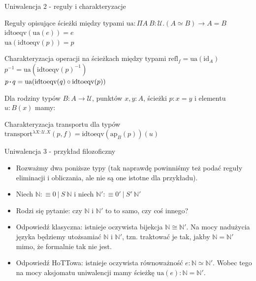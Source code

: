 \documentclass{beamer}
\newcommand{\defn}{:\equiv}
\newcommand{\U}{\mathcal{U}}
\newcommand{\id}{\text{id}}
\newcommand{\comp}{\circ}
\newcommand{\refl}[1]{\text{refl}_{#1}}
\newcommand{\inv}[1]{#1^{-1}}
\newcommand{\sq}{\mathbin{\vcenter{\hbox{\rule{.3ex}{.3ex}}}}}
\newcommand{\ap}[2]{\text{ap}_{#1}(#2)}
\newcommand{\transport}{\text{transport}}
\newcommand{\idtoeqv}{\text{idtoeqv}}
\newcommand{\ua}{\text{ua}}
\begin{document}
\begin{frame}{Uniwalencja 2 - reguły i charakteryzacje}

\begin{block}{Reguły opisujące ścieżki między typami}
$\ua : \Pi A\ B : \U. (A \simeq B) \to A = B$ \\

$\idtoeqv(\ua(e)) = e$ \\

$\ua(\idtoeqv(p)) = p$
\end{block}

\begin{block}{Charakteryzacja operacji na ścieżkach między typami}
$\refl{f} = \ua(\id_A)$ \\

$\inv{p} = \ua(\inv{\idtoeqv(p)})$ \\

$p \sq q = \ua(\idtoeqv(q) \comp \idtoeqv(p))$
\end{block}

Dla rodziny typów $B : A \to \U$, punktów $x, y : A$, ścieżki $p : x = y$ i elementu $u : B(x)$ mamy:

\begin{block}{Charakteryzacja transportu dla typów}
$\transport^{\lambda X : \U.X}(p, f) = \idtoeqv(\ap{B}{p})(u)$
\end{block}

\end{frame}

\begin{frame}{Uniwalencja 3 - przykład filozoficzny}
\begin{itemize}
	\item Rozważmy dwa poniższe typy (tak naprawdę powinniśmy też podać reguły eliminacji i obliczania, ale nie są one istotne dla przykładu).
	\item Niech $\mathbb{N} \defn 0 \: | \: S\ \mathbb{N}$ i niech $\mathbb{N}' \defn 0' \: | \: S'\ \mathbb{N}'$
	\item Rodzi się pytanie: czy $\mathbb{N}$ i $\mathbb{N}'$ to to samo, czy coś innego?
	\item Odpowiedź klasyczna: istnieje oczywista bijekcja $\mathbb{N} \cong \mathbb{N}'$. Na mocy nadużycia języka będziemy utożsamiać $\mathbb{N}$ i $\mathbb{N}'$, tzn. traktować je tak, jakby $\mathbb{N} = \mathbb{N}'$ mimo, że formalnie tak nie jest.
	\item Odpowiedź HoTTowa: istnieje oczywista równoważność $e : \mathbb{N} \simeq \mathbb{N}'$. Wobec tego na mocy aksjomatu uniwalencji mamy ścieżkę $\text{ua}(e) : \mathbb{N} = \mathbb{N}'$.
\end{itemize}
\end{frame}
\end{document}
